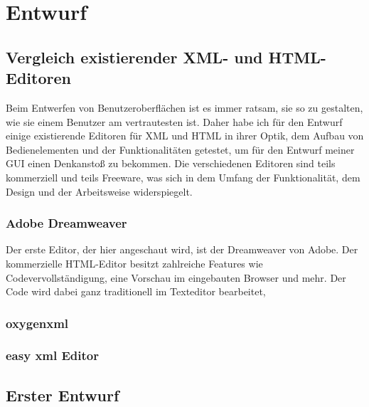\section{Entwurf}

\subsection{Vergleich existierender XML- und HTML-Editoren}

Beim Entwerfen von Benutzeroberflächen ist es immer ratsam, sie so zu gestalten, wie sie einem Benutzer am vertrautesten ist. Daher habe ich für den Entwurf einige existierende Editoren für XML und HTML in ihrer Optik, dem Aufbau von Bedienelementen und der Funktionalitäten getestet, um für den Entwurf meiner GUI einen Denkanstoß zu bekommen.
Die verschiedenen Editoren sind teils kommerziell und teils Freeware, was sich in dem Umfang der Funktionalität, dem Design und der Arbeitsweise widerspiegelt.

\subsubsection{Adobe Dreamweaver}

Der erste Editor, der hier angeschaut wird, ist der Dreamweaver von Adobe. Der kommerzielle HTML-Editor besitzt zahlreiche Features wie Codevervollständigung, eine Vorschau im eingebauten Browser und mehr. Der Code wird dabei ganz traditionell im Texteditor bearbeitet,
\subsubsection{oxygenxml}
\subsubsection{easy xml Editor}

\subsection{Erster Entwurf}
